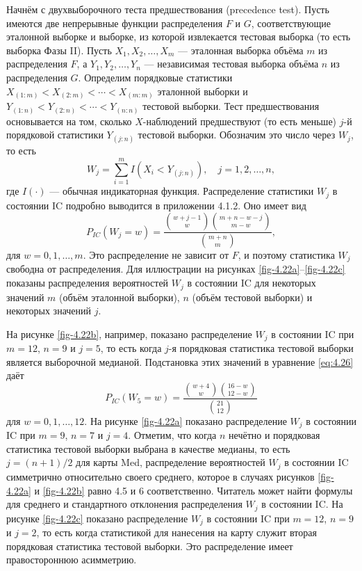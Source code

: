 Начнём с двухвыборочного теста предшествования (precedence test). Пусть имеются две непрерывные функции распределения \(F\) и \(G\), соответствующие эталонной выборке и выборке, из которой извлекается тестовая выборка (то есть выборка Фазы II). Пусть \(X_1, X_2, \ldots, X_m\) --- эталонная выборка объёма \(m\) из распределения \(F\), а \(Y_1, Y_2, \ldots, Y_n\) --- независимая тестовая выборка объёма \(n\) из распределения \(G\). Определим порядковые статистики \(X_{(1:m)} < X_{(2:m)} < \cdots < X_{(m:m)}\) эталонной выборки и \(Y_{(1:n)} < Y_{(2:n)} < \cdots < Y_{(n:n)}\) тестовой выборки. Тест предшествования основывается на том, сколько \(X\)-наблюдений предшествуют (то есть меньше) \(j\)-й порядковой статистики \(Y_{(j:n)}\) тестовой выборки. Обозначим это число через \(W_j\), то есть
\begin{equation}
	W_j = \sum_{i=1}^{m} I\left( X_i < Y_{(j:n)} \right), \quad j = 1, 2, \ldots, n,
	\label{eq:4.25}
\end{equation}
где \(I(\cdot)\) --- обычная индикаторная функция. Распределение статистики \(W_j\) в состоянии IC подробно выводится в приложении 4.1.2. Оно имеет вид
\begin{equation}
	P_{IC}(W_j = w) = \frac{\binom{w + j - 1}{w}\binom{m + n - w - j}{m - w}}{\binom{m + n}{m}},
	\label{eq:4.26}
\end{equation}
для \(w = 0, 1, \ldots, m\). Это распределение не зависит от \(F\), и поэтому статистика \(W_j\) свободна от распределения. Для иллюстрации на рисунках \ref{fig-4.22a}--\ref{fig-4.22c} показаны распределения вероятностей \(W_j\) в состоянии IC для некоторых значений \(m\) (объём эталонной выборки), \(n\) (объём тестовой выборки) и некоторых значений \(j\).



На рисунке \ref{fig-4.22b}, например, показано распределение \(W_j\) в состоянии IC при \(m = 12\), \(n = 9\) и \(j = 5\), то есть когда \(j\)-я порядковая статистика тестовой выборки является выборочной медианой. Подстановка этих значений в уравнение \eqref{eq:4.26} даёт
\[
	P_{IC}(W_5 = w) = \frac{\binom{w + 4}{w}\binom{16 - w}{12 - w}}{\binom{21}{12}}
\]
для \(w = 0, 1, \ldots, 12\). На рисунке \ref{fig-4.22a} показано распределение \(W_j\) в состоянии IC при \(m = 9\), \(n = 7\) и \(j = 4\). Отметим, что когда \(n\) нечётно и порядковая статистика тестовой выборки выбрана в качестве медианы, то есть \(j = (n + 1)/2\) для карты Med, распределение вероятностей \(W_j\) в состоянии IC симметрично относительно своего среднего, которое в случаях рисунков \ref{fig-4.22a} и \ref{fig-4.22b} равно 4.5 и 6 соответственно. Читатель может найти формулы для среднего и стандартного отклонения распределения \(W_j\) в состоянии IC. На рисунке \ref{fig-4.22c} показано распределение \(W_j\) в состоянии IC при \(m = 12\), \(n = 9\) и \(j = 2\), то есть когда статистикой для нанесения на карту служит вторая порядковая статистика тестовой выборки. Это распределение имеет правостороннюю асимметрию.

